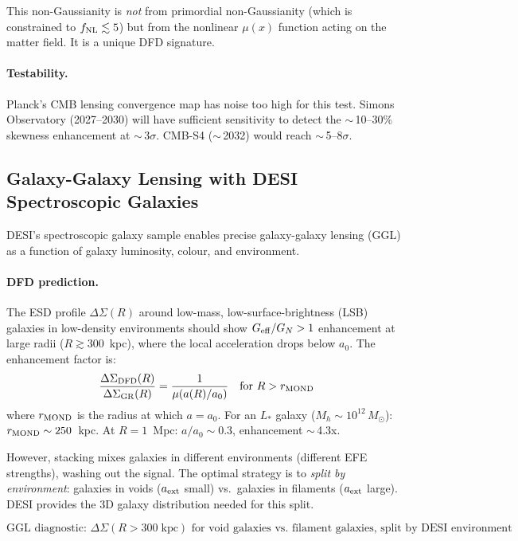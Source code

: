 \documentclass[11pt,a4paper]{article}
\newcommand{\Geff}{G_{\rm eff}}
\begin{document}
This non-Gaussianity is \emph{not} from primordial non-Gaussianity
(which is constrained to $f_{\rm NL} \lesssim 5$) but from the
nonlinear $\mu(x)$ function acting on the matter field.  It is a
unique DFD signature.

\paragraph{Testability.}
Planck's CMB lensing convergence map has noise too high for this test.
Simons Observatory (2027--2030) will have sufficient sensitivity to
detect the $\sim$\,10--30\% skewness enhancement at $\sim$\,3$\sigma$.
CMB-S4 ($\sim$\,2032) would reach $\sim$\,5--8$\sigma$.

\subsection{Galaxy-Galaxy Lensing with DESI Spectroscopic Galaxies}

DESI's spectroscopic galaxy sample enables precise galaxy-galaxy lensing
(GGL) as a function of galaxy luminosity, colour, and environment.

\paragraph{DFD prediction.}
The ESD profile $\Delta\Sigma(R)$ around low-mass, low-surface-brightness
(LSB) galaxies in low-density environments should show $\Geff/G_N > 1$
enhancement at large radii ($R \gtrsim 300$~kpc), where the local
acceleration drops below $a_0$.  The enhancement factor is:
\begin{equation}
\frac{\Delta\Sigma_{\rm DFD}(R)}{\Delta\Sigma_{\rm GR}(R)}
= \frac{1}{\mu(a(R)/a_0)} \quad \text{for } R > r_{\rm MOND}
\end{equation}
where $r_{\rm MOND}$ is the radius at which $a = a_0$.  For an
$L_*$ galaxy ($M_h \sim 10^{12}\,M_\odot$): $r_{\rm MOND} \sim
250$~kpc.  At $R = 1$~Mpc: $a/a_0 \sim 0.3$, enhancement $\sim$\,4.3x.

However, stacking mixes galaxies in different environments (different
EFE strengths), washing out the signal.  The optimal strategy is to
\emph{split by environment}: galaxies in voids ($a_{\rm ext}$ small)
vs.\ galaxies in filaments ($a_{\rm ext}$ large).  DESI provides the
3D galaxy distribution needed for this split.

\begin{equation}
\boxed{
\text{GGL diagnostic: } \Delta\Sigma(R > 300\;\text{kpc})\text{ for
void galaxies vs.\ filament galaxies, split by DESI environment}
}
\end{equation}
\end{document}
